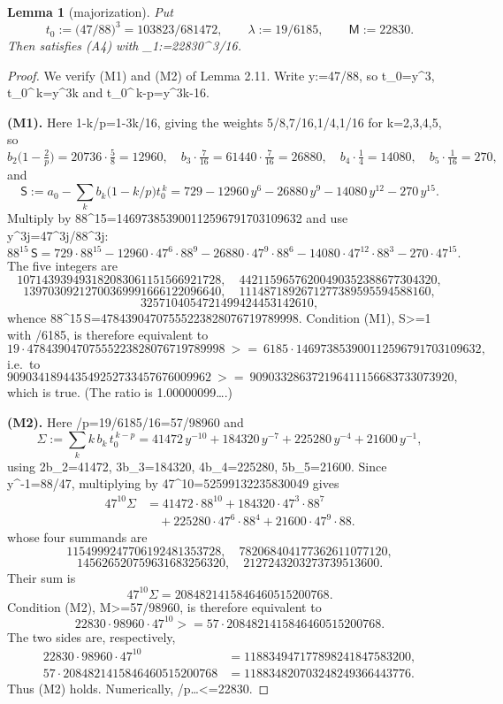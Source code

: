 \documentclass[10pt,reqno]{amsart}
\def\({}\def\){}%
\def\frac#1#2{#1/#2}%
\def\ge{>=}\def\le{<=}%
\newtheorem{lemma}[theorem]{Lemma}
\theoremstyle{definition}
\theoremstyle{remark}
\begin{document}
\begin{lemma}[majorization]\label{lem:4-7}
Put \[t_0:=\Big(\frac{47}{88}\Big)^{3}=\frac{103823}{681472},\qquad
\lambda:=\frac{19}{6185},\qquad \mathsf M:=22830 .\] Then \(\lambda\varphi\) satisfies (A4) with \(\Lambda_1:=22830^{\,3/16}\).
\end{lemma}

\begin{proof}
We verify (M1) and (M2) of Lemma 2.11. Write \(y:=\frac{47}{88}\), so \(t_0=y^3\), \(t_0^{\,k}=y^{3k}\) and \(t_0^{\,k-p}=y^{3k-16}\).

\textbf{(M1).} Here \(1-\frac kp=1-\frac{3k}{16}\), giving the weights \(\frac58,\frac7{16},\frac14,\frac1{16}\) for \(k=2,3,4,5\), so \[b_2\Big(1-\tfrac2p\Big)=20736\cdot\tfrac58=12960,\quad
b_3\cdot\tfrac7{16}=61440\cdot\tfrac7{16}=26880,\quad
b_4\cdot\tfrac14=14080,\quad b_5\cdot\tfrac1{16}=270 ,\] and \[\mathsf S:=a_0-\sum_kb_k\Big(1-\frac kp\Big)t_0^{\,k}
=729-12960\,y^{6}-26880\,y^{9}-14080\,y^{12}-270\,y^{15}.\] Multiply by \(88^{15}=146973853900112596791703109632\) and use \(y^{3j}=47^{3j}/88^{3j}\): \[88^{15}\,\mathsf S=729\cdot88^{15}-12960\cdot47^{6}\cdot88^{9}
-26880\cdot47^{9}\cdot88^{6}-14080\cdot47^{12}\cdot88^{3}-270\cdot47^{15}.\] The five integers are \[107143939493182083061151566921728,\quad 44211596576200490352388677304320,\] \[13970309212700369991666122096640,\quad 1114871892671277389595594588160,\] \[3257104054721499424453142610,\] whence \(88^{15}\,\mathsf S=47843904707555223828076719789998\). Condition (M1), \(\lambda\mathsf S\ge1\) with \(\lambda=\frac{19}{6185}\), is therefore equivalent to \[19\cdot47843904707555223828076719789998\ \ge\
6185\cdot146973853900112596791703109632,\] i.e.~to \[909034189443549252733457676009962\ \ge\ 909033286372196411156683733073920 ,\] which is true. (The ratio is \(1.00000099\ldots\).)

\textbf{(M2).} Here \(\frac{\lambda}p=\frac{19}{6185}\cdot\frac3{16}=\frac{57}{98960}\) and \[\Sigma:=\sum_kk\,b_k\,t_0^{\,k-p}
=41472\,y^{-10}+184320\,y^{-7}+225280\,y^{-4}+21600\,y^{-1},\] using \(2b_2=41472\), \(3b_3=184320\), \(4b_4=225280\), \(5b_5=21600\). Since \(y^{-1}=\frac{88}{47}\), multiplying by \(47^{10}=52599132235830049\) gives \[
\begin{aligned}
47^{10}\Sigma
 &=41472\cdot88^{10}+184320\cdot47^{3}\cdot88^{7}\\
 &\quad+225280\cdot47^{6}\cdot88^{4}+21600\cdot47^{9}\cdot88.
\end{aligned}
\] whose four summands are
\[1154999247706192481353728,\quad 782068404177362611077120,\]
\[145626520759631683256320,\quad 2127243203273739513600.\]
Their sum is
\[47^{10}\Sigma=2084821415846460515200768.\]
Condition (M2), \(\mathsf M\ge\frac{57}{98960}\Sigma\), is therefore equivalent to
\[22830\cdot98960\cdot47^{10}\ge57\cdot2084821415846460515200768.\]
The two sides are, respectively,
\[
\begin{aligned}
22830\cdot98960\cdot47^{10}
 &=118834947177898241847583200,\\
57\cdot2084821415846460515200768
 &=118834820703248249366443776.
\end{aligned}
\]
Thus (M2) holds.  Numerically, \(\frac{\lambda}{p}\ldots\le22830\).


\end{proof}
\end{document}
